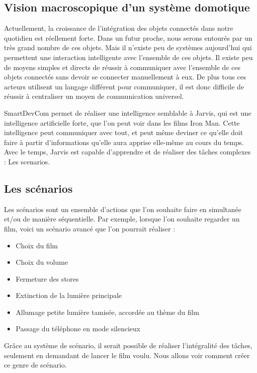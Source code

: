 	\subsection{Vision macroscopique d’un système domotique}
Actuellement, la croissance de l'intégration des objets connectés dans notre quotidien est réellement forte. 
Dans un futur proche, nous serons entourés par un très grand nombre de ces objets. Mais il n'existe peu de systèmes aujourd'hui qui permettent une interaction intelligente avec l'ensemble de ces objets. Il existe peu de moyens simples et directs de réussir à communiquer avec l'ensemble de ces objets connectés sans devoir se connecter manuellement à eux. De plus tous ces acteurs utilisent un langage différent pour communiquer, il est donc difficile de réussir à centraliser un moyen de communication universel.

SmartDevCom permet de réaliser une intelligence semblable à Jarvis, qui est une intelligence 
artificielle forte, que l'on peut voir dans les films Iron Man. Cette intelligence peut communiquer 
avec tout, et peut même deviner ce qu'elle doit faire à partir d'informations qu'elle aura apprise 
elle-même au cours du temps. Avec le temps, Jarvis est capable d'apprendre et de réaliser des 
tâches complexes : Les scenarios.

	\subsection{Les scénarios}
Les scénarios sont un ensemble d'actions que l'on souhaite faire en simultanée et/ou de manière séquentielle. 
Par exemple, lorsque l'on souhaite regarder un film, voici un scénario avancé que l'on pourrait réaliser :
\begin{itemize}
 \item Choix du film
 \item Choix du volume
 \item Fermeture des stores
 \item Extinction de la lumière principale
 \item Allumage petite lumière tamisée, accordée au thème du film
 \item Passage du téléphone en mode silencieux 
\end{itemize}

Grâce au système de scénario, il serait possible de réaliser l'intégralité des tâches, seulement en demandant de lancer le film voulu. Nous allons voir comment créer ce genre de scénario.
